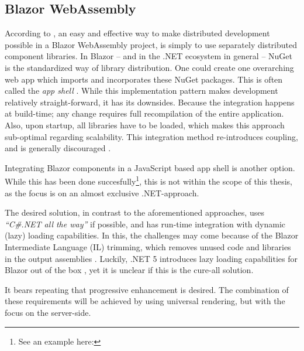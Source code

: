 \subsection{Blazor WebAssembly}
According to \textcite{Rappl_MunichNETMeetup_2020}, an easy and effective way to
make distributed development possible in a Blazor WebAssembly project, is simply
to use separately distributed component libraries. In Blazor -- and in the .NET
ecosystem in general -- NuGet is the
standardized way of library distribution. One could create one overarching web
app which imports and incorporates these NuGet packages. This is often called
the \textit{app shell} \autocite{Geers_2020}. While this implementation pattern
makes development relatively straight-forward, it has its downsides. Because the
integration happens at build-time; any change requires full recompilation of the
entire application. Also, upon startup, all libraries have to be loaded, which
makes this approach sub-optimal regarding scalability. This integration method
re-introduces coupling, and is generally discouraged \autocite{Jackson_2019}.

Integrating Blazor components in a JavaScript based app shell is another option.
While this has been done succesfully\footnote{See an example here:
}, this is
not within the scope of this thesis, as the focus is on an almost exclusive
.NET-approach.

The desired solution, in contrast to the aforementioned approaches, uses
\textit{``C\#.NET all the way''} if possible, and has run-time integration with
dynamic (lazy) loading capabilities. In this, the challenges may come because of
the Blazor Intermediate Language (IL) trimming, which removes unused code and
libraries in the output assemblies \autocite{Latham_2020}. Luckily, .NET 5
introduces lazy loading capabilities for Blazor out of the box
\autocite{Kdouh_2020} \autocite{Rappl_dotNETConf_2020}, yet it is unclear if
this is the cure-all solution.

It bears repeating that progressive enhancement is desired. The combination of
these requirements will be achieved by using universal rendering, but with the
focus on the server-side.





